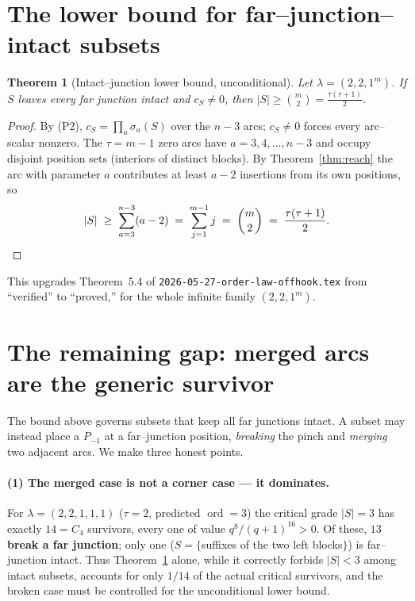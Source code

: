 \documentclass[11pt]{article}
\newtheorem{theorem}{Theorem}
\theoremstyle{definition}
\DeclareMathOperator{\ord}{ord}
\newcommand{\Pm}{P_{-1}}
\newcommand{\la}{\lambda}
\begin{document}
\section{The lower bound for far--junction--intact subsets}

\begin{theorem}[Intact--junction lower bound, unconditional]\label{thm:lb}
Let $\la=(2,2,1^m)$. If $S$ leaves every far junction intact and $c_S\ne0$, then
$|S|\ge\binom m2=\tfrac{\tau(\tau+1)}2$.
\end{theorem}

\begin{proof}
By (P2), $c_S=\prod_a\sigma_a(S)$ over the $n-3$ arcs; $c_S\ne0$ forces every
arc--scalar nonzero. The $\tau=m-1$ zero arcs have $a=3,4,\dots,n-3$ and occupy disjoint
position sets (interiors of distinct blocks). By Theorem~\ref{thm:reach} the arc with
parameter $a$ contributes at least $a-2$ insertions from its own positions, so
\[
|S|\;\ge\;\sum_{a=3}^{n-3}(a-2)\;=\;\sum_{j=1}^{m-1}j\;=\;\binom m2\;=\;\frac{\tau(\tau+1)}2 . \qedhere
\]
\end{proof}

This upgrades Theorem~5.4 of \texttt{2026-05-27-order-law-offhook.tex} from
``verified'' to ``proved,'' for the whole infinite family $(2,2,1^m)$.

\section{The remaining gap: merged arcs are the generic survivor}

The bound above governs subsets that keep all far junctions intact. A subset may instead
place a $\Pm$ at a far--junction position, \emph{breaking} the pinch and \emph{merging}
two adjacent arcs. We make three honest points.

\paragraph{(1) The merged case is not a corner case --- it dominates.}
For $\la=(2,2,1,1,1)$ ($\tau=2$, predicted $\ord=3$) the critical grade $|S|=3$ has exactly
$14=C_4$ survivors, every one of value $q^8/(q+1)^{16}>0$. Of these, \textbf{$13$ break a
far junction}; only one ($S=\{$suffixes of the two left blocks$\}$) is far--junction
intact. Thus Theorem~\ref{thm:lb} alone, while it correctly forbids $|S|<3$ among intact
subsets, accounts for only $1/14$ of the actual critical survivors, and the broken case
must be controlled for the unconditional lower bound.
\end{document}
